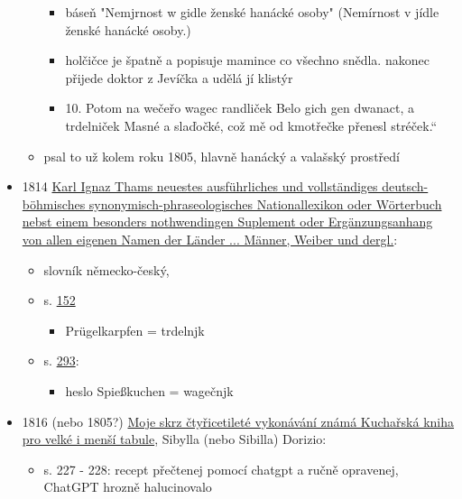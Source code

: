 \begin{itemize}
\begin{itemize}
    \begin{itemize}
    \tightlist
    \item
      báseň "Nemjrnost w gidle ženské hanácké osoby" (Nemírnost v jídle
      ženské hanácké osoby.)
    \item
      holčičce je špatně a popisuje mamince co všechno snědla. nakonec
      přijede doktor z Jevíčka a udělá jí klistýr
    \item
      10. Potom na wečeřo wagec randliček Belo gich gen dwanact, a
      trdelniček Masné a slaďočké, což mě od kmotřečke přenesl
      stréček.``
    \end{itemize}
  \item
    psal to už kolem roku 1805, hlavně hanácký a valašský prostředí
  \end{itemize}
\item
  1814
  \href{https://ndk.cz/uuid/uuid:4672a240-c28c-11dc-9931-000d606f5dc6}{Karl
  Ignaz Thams neuestes ausführliches und vollständiges
  deutsch-böhmisches synonymisch-phraseologisches Nationallexikon oder
  Wörterbuch nebst einem besonders nothwendingen Suplement oder
  Ergänzungsanhang von allen eigenen Namen der Länder ... Männer, Weiber
  und dergl.}:

  \begin{itemize}
  \tightlist
  \item
    slovník německo-český,
  \item
    s.
    \href{https://ndk.cz/uuid/uuid:4672a240-c28c-11dc-9931-000d606f5dc6}{152}

    \begin{itemize}
    \tightlist
    \item
      Prügelkarpfen = trdelnjk
    \end{itemize}
  \item
    s.
    \href{https://ceskadigitalniknihovna.cz/uuid/uuid:9b4f95a7-eb8b-4008-8023-15cc5563f0ed}{293}:

    \begin{itemize}
    \tightlist
    \item
      heslo Spießkuchen = wagečnjk
    \end{itemize}
  \end{itemize}
\item
  1816 (nebo 1805?)
  \href{https://books.google.cz/books?id=7SZjAAAAcAAJ&hl=cs&pg=PA227\#v=onepage&q&f=false}{Moje
  skrz čtyřicetileté vykonávání známá Kuchařská kniha pro velké i menší
  tabule}, Sibylla (nebo Sibilla) Dorizio:

  \begin{itemize}
  \tightlist
  \item
    s. 227 - 228: recept přečtenej pomocí chatgpt a ručně opravenej,
    ChatGPT hrozně halucinovalo


\end{itemize}
\end{itemize}
